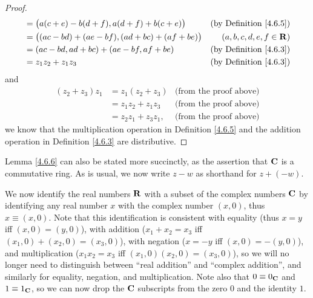 \begin{proof}
\begin{align*}
                        & = \big(a (c + e) - b (d + f), a (d + f) + b (c + e)\big)  & \text{(by Definition \ref{4.6.5})} \\
                        & = \big((ac - bd) + (ae - bf), (ad + bc) + (af + be) \big) & (a, b, c, d, e, f \in \mathbf{R})          \\
                        & = (ac - bd, ad + bc) + (ae - bf, af + be)                 & \text{(by Definition \ref{4.6.3})} \\
                        & = z_1 z_2 + z_1 z_3                                       & \text{(by Definition \ref{4.6.3})}
    \end{align*}
    and
    \begin{align*}
        (z_2 + z_3) z_1 & = z_1 (z_2 + z_3)    & \text{(from the proof above)} \\
                        & = z_1 z_2 + z_1 z_3  & \text{(from the proof above)} \\
                        & = z_2 z_1 + z_3 z_1, & \text{(from the proof above)}
    \end{align*}
    we know that the multiplication operation in Definition \ref{4.6.5} and the addition operation in Definition \ref{4.6.3} are distributive.
\end{proof}

\begin{note}
    Lemma \ref{4.6.6} can also be stated more succinctly, as the assertion that \(\mathbf{C}\) is a commutative ring.
    As is usual, we now write \(z - w\) as shorthand for \(z + (-w)\).
\end{note}

\begin{note}
    We now identify the real numbers \(\mathbf{R}\) with a subset of the complex numbers \(\mathbf{C}\) by identifying any real number \(x\) with the complex number \((x, 0)\), thus \(x \equiv (x, 0)\).
    Note that this identification is consistent with equality (thus \(x = y\) iff \((x, 0) = (y, 0)\)), with addition (\(x_1 + x_2 = x_3\) iff \((x_1, 0) + (x_2, 0) = (x_3, 0)\)), with negation (\(x = -y\) iff \((x, 0) = -(y, 0)\)), and multiplication (\(x_1 x_2 = x_3\) iff \((x_1, 0) (x_2, 0) = (x_3, 0)\)), so we will no longer need to distinguish between ``real addition'' and ``complex addition'', and similarly for equality, negation, and multiplication.
    Note also that \(0 \equiv 0_{\mathbf{C}}\) and \(1 \equiv 1_{\mathbf{C}}\), so we can now drop the \(\mathbf{C}\) subscripts from the zero \(0\) and the identity \(1\).
\end{note}

